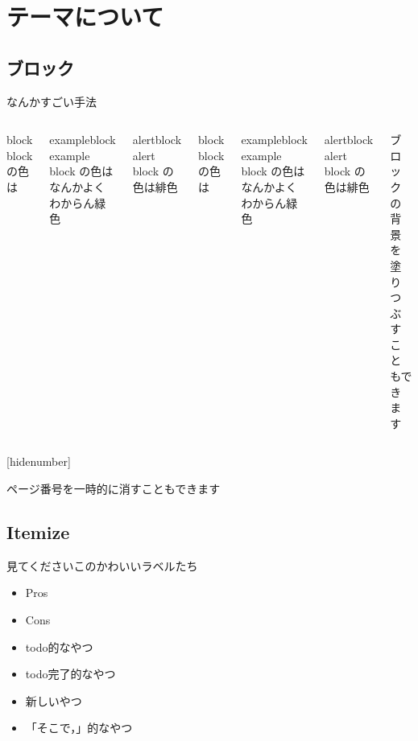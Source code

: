 \section{テーマについて}
\subsection{ブロック}
\begin{frame}{\insertsubsection}
  なんかすごい手法\cite{Ono:2010:LVAICA,Ono:2011:WASPAA,Ono:2012:IWAENC}
  \begin{columns}[T,onlytextwidth]
      \begin{block}{block}
        block の色は
      \end{block}
      \begin{exampleblock}{exampleblock}
        example block の色は\textcolor{example text.fg}{なんかよくわからん緑色}
      \end{exampleblock}
      \begin{alertblock}{alertblock}
        alert block の色は\textcolor{alerted text.fg}{緋色}
      \end{alertblock}
      \begin{block}{block}
        block の色は
      \end{block}
      \begin{exampleblock}{exampleblock}
        example block の色は\textcolor{example text.fg}{なんかよくわからん緑色}
      \end{exampleblock}
      \begin{alertblock}{alertblock}
        alert block の色は\textcolor{alerted text.fg}{緋色}
      \end{alertblock}
      ブロックの背景を塗りつぶすこともできます
  \end{columns}
\end{frame}

{
  [hidenumber]
  \begin{frame}[noframenumbering]{\insertsubsection}
    ページ番号を一時的に消すこともできます
  \end{frame}
}

\subsection{Itemize}
\begin{frame}{\insertsubsection}
    見てくださいこのかわいいラベルたち
    \begin{itemize}
      \item[\pros] Pros
      \item[\cons] Cons
      \item[\todo] todo的なやつ
      \item[\done] todo完了的なやつ
      \item[\new] 新しいやつ
      \item[\goal] 「そこで，」的なやつ
    \end{itemize}
\end{frame}

